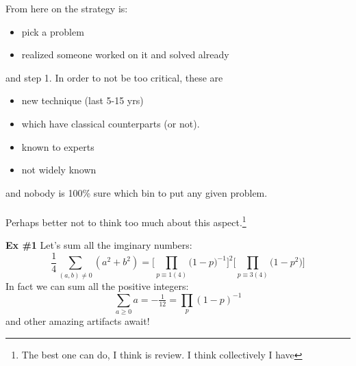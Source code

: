 \documentclass[12pt]{article}
\begin{document}
\selectfont \fontsize{25}{30}\selectfont

\noindent From here on the strategy is:
\begin{itemize}
\item pick a problem
\item realized someone worked on it and solved already
\end{itemize}
and step 1.  In order to not be too critical, these are 
\begin{itemize}
\item new technique (last 5-15 yrs) 
\item which have classical counterparts (or not).
\item known to experts
\item not widely known
\end{itemize}
and nobody is 100\% sure which bin to put any given problem. \\ \\
Perhaps better not to think too much about this aspect.\footnote{The best one can do, I think is review.  I think collectively I have } 

\newpage

\noindent \textbf{Ex \#1} Let's sum all the imginary numbers:
$$ \frac{1}{4}\sum_{(a,b) \neq 0} (a^2 + b^2) = \bigg[ \prod_{p \equiv 1 (4)} \big(1-p\big)^{-1} \bigg]^2
\bigg[ \prod_{p \equiv 3 (4)} \big(1-p^2\big) \bigg]
 $$
In fact we can sum all the positive integers:
$$ \sum_{a \geq 0} a = - \tfrac{1}{12} = \prod_p (1-p)^{-1}$$
and other amazing artifacts await!
\end{document}
